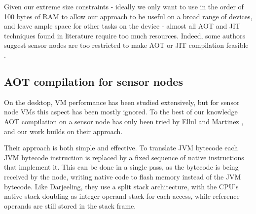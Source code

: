 Given our extreme size constraints - ideally we only want to use in the order of 100 bytes of RAM to allow our approach to be useful on a broad range of devices, and leave ample space for other tasks on the device - almost all AOT and JIT techniques found in literature require too much resources. Indeed, some authors suggest sensor nodes are too restricted to make AOT or JIT compilation feasible \cite{Aslam:2011thesis, Wirjawan:2008}.

\subsection{AOT compilation for sensor nodes}
\label{sec-state-of-the-art-elluls-aot}
On the desktop, VM performance has been studied extensively, but for sensor node VMs this aspect has been mostly ignored. To the best of our knowledge AOT compilation on a sensor node has only been tried by Ellul and Martinez \cite{Ellul:2010iw, Ellul:2012thesis}, and our work builds on their approach.

Their approach is both simple and effective. To translate JVM bytecode each JVM bytecode instruction is replaced by a fixed sequence of native instructions that implement it. This can be done in a single pass, as the bytecode is being received by the node, writing native code to flash memory instead of the JVM bytecode. Like Darjeeling, they use a split stack architecture, with the CPU's native stack doubling as integer operand stack for each access, while reference operands are still stored in the stack frame.

